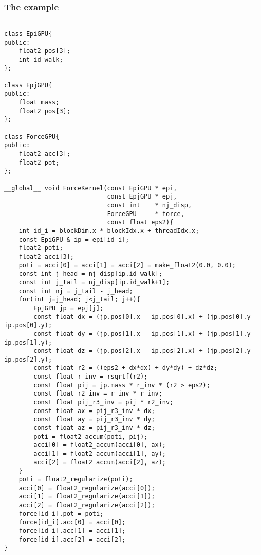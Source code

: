 \subsubsection{The example}

\begin{lstlisting}[caption=calcForceDispatch]

class EpiGPU{
public:
    float2 pos[3];
    int id_walk;
};

class EpjGPU{
public:
    float mass;
    float2 pos[3];
};

class ForceGPU{
public:
    float2 acc[3];
    float2 pot;
};
  
__global__ void ForceKernel(const EpiGPU * epi,
                            const EpjGPU * epj, 
                            const int    * nj_disp,
                            ForceGPU     * force,
                            const float eps2){
    int id_i = blockDim.x * blockIdx.x + threadIdx.x;
    const EpiGPU & ip = epi[id_i];
    float2 poti;
    float2 acci[3];
    poti = acci[0] = acci[1] = acci[2] = make_float2(0.0, 0.0);
    const int j_head = nj_disp[ip.id_walk];
    const int j_tail = nj_disp[ip.id_walk+1];
    const int nj = j_tail - j_head;
    for(int j=j_head; j<j_tail; j++){
        EpjGPU jp = epj[j];
        const float dx = (jp.pos[0].x - ip.pos[0].x) + (jp.pos[0].y - ip.pos[0].y);
        const float dy = (jp.pos[1].x - ip.pos[1].x) + (jp.pos[1].y - ip.pos[1].y);
        const float dz = (jp.pos[2].x - ip.pos[2].x) + (jp.pos[2].y - ip.pos[2].y);
        const float r2 = ((eps2 + dx*dx) + dy*dy) + dz*dz;
        const float r_inv = rsqrtf(r2);
        const float pij = jp.mass * r_inv * (r2 > eps2); 
        const float r2_inv = r_inv * r_inv; 
        const float pij_r3_inv = pij * r2_inv; 
        const float ax = pij_r3_inv * dx; 
        const float ay = pij_r3_inv * dy;
        const float az = pij_r3_inv * dz;
        poti = float2_accum(poti, pij);
        acci[0] = float2_accum(acci[0], ax);
        acci[1] = float2_accum(acci[1], ay);
        acci[2] = float2_accum(acci[2], az);
    }
    poti = float2_regularize(poti);
    acci[0] = float2_regularize(acci[0]);
    acci[1] = float2_regularize(acci[1]);
    acci[2] = float2_regularize(acci[2]);
    force[id_i].pot = poti;
    force[id_i].acc[0] = acci[0];
    force[id_i].acc[1] = acci[1];
    force[id_i].acc[2] = acci[2];
}


\end{lstlisting}
